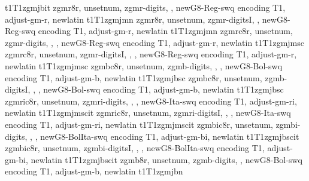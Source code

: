 {t1}{T1}{zgmj}{b}{it}{}
%
{zgmr8r,%
unsetnum,%
zgmr-digits,%
\metrics {},%
newG8-Reg-swq encoding T1,%
adjust-gm-r,%
newlatin}
{t1}{T1}{zgmj}{m}{n}{}
%
{zgmr8r,%
unsetnum,%
zgmr-digitsI,%
\metrics {},%
newG8-Reg-swq encoding T1,%
adjust-gm-r,%
newlatin}
{t1}{T1}{zgmj}{m}{n}{}
%
{zgmrc8r,%
unsetnum,%
zgmr-digits,%
\metrics {}  ,%
\metrics {},%
newG8-Reg-swq encoding T1,%
adjust-gm-r,%
newlatin}
{t1}{T1}{zgmj}{m}{sc}{}
%
{zgmrc8r,%
unsetnum,%
zgmr-digitsI,%
\metrics {}  ,%
\metrics {},%
newG8-Reg-swq encoding T1,%
adjust-gm-r,%
newlatin}
{t1}{T1}{zgmj}{m}{sc}{}
%
{zgmbc8r,%
unsetnum,%
zgmb-digits,%
\metrics {}  ,%
\metrics {},%
newG8-Bol-swq encoding T1,%
adjust-gm-b,%
newlatin}
{t1}{T1}{zgmj}{b}{sc}{}
%
{zgmbc8r,%
unsetnum,%
zgmb-digitsI,%
\metrics {}  ,%
\metrics {},%
newG8-Bol-swq encoding T1,%
adjust-gm-b,%
newlatin}
{t1}{T1}{zgmj}{b}{sc}{}
%
{zgmric8r,%
unsetnum,%
zgmri-digits,%
\metrics {}  ,%
\metrics {},%
newG8-Ita-swq encoding T1,%
adjust-gm-ri,%
newlatin}
{t1}{T1}{zgmj}{m}{scit}{}
%
{zgmric8r,%
unsetnum,%
zgmri-digitsI,%
\metrics {}  ,%
\metrics {},%
newG8-Ita-swq encoding T1,%
adjust-gm-ri,%
newlatin}
{t1}{T1}{zgmj}{m}{scit}{}
%
{zgmbic8r,%
unsetnum,%
zgmbi-digits,%
\metrics {}  ,%
\metrics {},%
newG8-BolIta-swq encoding T1,%
adjust-gm-bi,%
newlatin}
{t1}{T1}{zgmj}{b}{scit}{}
%
{zgmbic8r,%
unsetnum,%
zgmbi-digitsI,%
\metrics {}  ,%
\metrics {},%
newG8-BolIta-swq encoding T1,%
adjust-gm-bi,%
newlatin}
{t1}{T1}{zgmj}{b}{scit}{}
%
{zgmb8r,%
unsetnum,%
zgmb-digits,%
\metrics {},%
newG8-Bol-swq encoding T1,%
adjust-gm-b,%
newlatin}
{t1}{T1}{zgmj}{b}{n}{}
%
